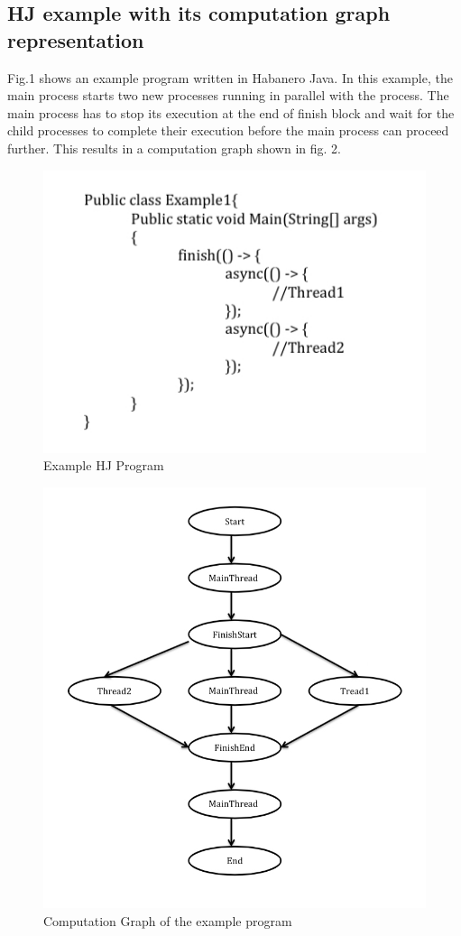 \subsection{HJ example with its computation graph representation}
Fig.1 shows an example program written in Habanero Java. In this example, the main process starts two new processes running in parallel with the process. The main process has to stop its execution at the end of finish block and wait for the child processes to complete their execution before the main process can proceed further. This results in a computation graph shown in fig. 2. 

\begin{figure}[h!]
  \caption{Example HJ Program}
    \includegraphics[scale=0.5]{../figs/Fig1.jpg} 
\end{figure}
\begin{figure}[h!]
  \caption{Computation Graph of the example program}
    \includegraphics[scale=0.4]{../figs/Fig2.jpg}
\end{figure}
